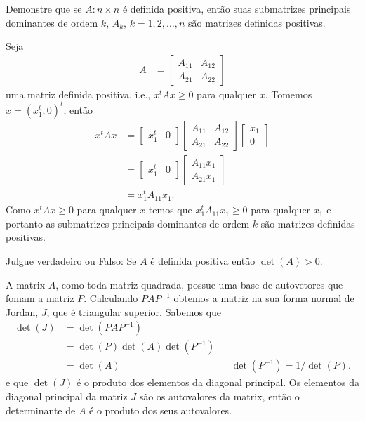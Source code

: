 \begin{questions}
    \question Demonstre que se $A : n \times n$ \'{e} definida positiva, ent\~{a}o suas submatrizes principais dominantes de ordem $k$, $A_k$, $k = 1, 2, \ldots, n$ s\~{a}o matrizes definidas positivas.
    \begin{solution}
        Seja
        \begin{align*}
            A &= \begin{bmatrix}
                A_{11} & A_{12} \\
                A_{21} & A_{22}
            \end{bmatrix}
        \end{align*}
        uma matriz definida positiva, i.e., $x^t A x \geq 0$ para qualquer $x$. Tomemos $x = (x_1^t, 0)^t$, ent\~{a}o
        \begin{align*}
            x^t A x &= \begin{bmatrix}
                x_1^t & 0
            \end{bmatrix} \begin{bmatrix}
                A_{11} & A_{12} \\
                A_{21} & A_{22}
            \end{bmatrix} \begin{bmatrix}
                x_1 \\
                0
            \end{bmatrix} \\
            &= \begin{bmatrix}
                x_1^t & 0
            \end{bmatrix} \begin{bmatrix}
                A_{11} x_1 \\
                A_{21} x_1
            \end{bmatrix} \\
            &= x_1^t A_{11} x_1.
        \end{align*}
        Como $x^t A x \geq 0$ para qualquer $x$ temos que $x_1^t A_{11} x_1 \geq 0$ para qualquer $x_1$ e portanto as submatrizes principais dominantes de ordem $k$ s\~{a}o matrizes definidas positivas.
    \end{solution}

    \question Julgue verdadeiro ou Falso: Se $A$ \'{e} definida positiva ent\~{a}o $\det(A) > 0$.
    \begin{solution}
        A matrix $A$, como toda matriz quadrada, possue uma base de autovetores que fomam a matriz $P$. Calculando $P A P^{-1}$ obtemos a matriz na sua forma normal de Jordan, $J$, que \'{e} triangular superior. Sabemos que
        \begin{align*}
            \det(J) &= \det(P A P^{-1}) \\
            &= \det(P) \det(A) \det(P^{-1}) \\
            &= \det(A) && \det(P^{-1}) = 1 / \det(P).
        \end{align*}
        e que $\det(J)$ \'{e} o produto dos elementos da diagonal principal. Os elementos da diagonal principal da matriz $J$ s\~{a}o os autovalores da matrix, ent\~{a}o o determinante de $A$ \'{e} o produto dos seus autovalores.


\end{solution}
\end{questions}
